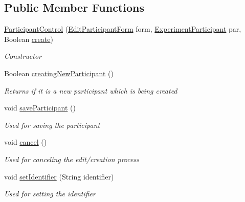 \subsection*{Public Member Functions}
\begin{DoxyCompactItemize}
\item 
\hyperlink{class_web_analyzer_1_1_u_i_1_1_interaction_objects_1_1_participant_control_acbbf6818f36ccddc69c2e0676616a9d9}{Participant\+Control} (\hyperlink{class_web_analyzer_1_1_u_i_1_1_edit_participant_form}{Edit\+Participant\+Form} form, \hyperlink{class_web_analyzer_1_1_models_1_1_base_1_1_experiment_participant}{Experiment\+Participant} par, Boolean \hyperlink{_u_i_2_h_t_m_l_resources_2js_2lib_2underscore_8min_8js_a8bd5981157799459d39a59e8c4a0de04}{create})
\begin{DoxyCompactList}\small\item\em Constructor \end{DoxyCompactList}\item 
Boolean \hyperlink{class_web_analyzer_1_1_u_i_1_1_interaction_objects_1_1_participant_control_a7322f5b6846c152c3839627dd76499a5}{creating\+New\+Participant} ()
\begin{DoxyCompactList}\small\item\em Returns if it is a new participant which is being created \end{DoxyCompactList}\item 
void \hyperlink{class_web_analyzer_1_1_u_i_1_1_interaction_objects_1_1_participant_control_ab90ab2f4742cf71d9794493a829b0761}{save\+Participant} ()
\begin{DoxyCompactList}\small\item\em Used for saving the participant \end{DoxyCompactList}\item 
void \hyperlink{class_web_analyzer_1_1_u_i_1_1_interaction_objects_1_1_participant_control_ab0eb72538ef9ab71a0ba4e62ccd9b248}{cancel} ()
\begin{DoxyCompactList}\small\item\em Used for canceling the edit/creation process \end{DoxyCompactList}\item 
void \hyperlink{class_web_analyzer_1_1_u_i_1_1_interaction_objects_1_1_participant_control_ac3070d10033a596ae93ed517350eaa77}{set\+Identifier} (String identifier)
\begin{DoxyCompactList}\small\item\em Used for setting the identifier \end{DoxyCompactList}\item 

\end{DoxyCompactItemize}

